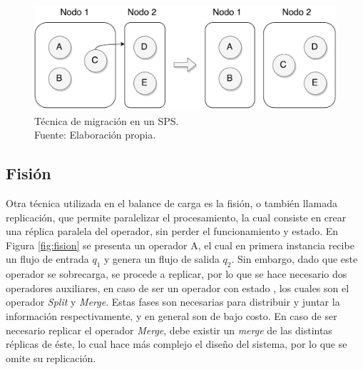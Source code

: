 \begin{figure}[!ht]
	\centering
	\includegraphics[scale=0.45]{images/Migracion.pdf}
	\caption[T\'ecnica de migraci\'on en un SPS.]{T\'ecnica de migraci\'on en un SPS.\\Fuente: Elaboraci\'on propia.}
	\label{fig:migracion}
\end{figure}

\subsection{Fisi\'on}
\label{sec:fisionBC}


Otra t\'ecnica utilizada en el balance de carga es la fisi\'on, o tambi\'en llamada replicaci\'on, que permite paralelizar el procesamiento, la cual consiste en crear una r\'eplica paralela del operador, sin perder el funcionamiento y estado. En Figura \ref{fig:fision} se presenta un operador A, el cual en primera instancia recibe un flujo de entrada $q_1$ y genera un flujo de salida $q_2$. Sin embargo, dado que este operador se sobrecarga, se procede a replicar, por lo que se hace necesario dos operadores auxiliares, \normalsize{en caso de ser un operador con estado} \citep{WuKWO12}, los cuales son el operador \textit{Split} y \textit{Merge}. Estas fases son necesarias para distribuir y juntar la informaci\'on respectivamente, y en general son de bajo costo. En caso de ser necesario replicar el operador \textit{Merge}, debe existir un \textit{merge} de las distintas r\'eplicas de \'este, lo cual hace m\'as complejo el dise\~no del sistema, por lo que se omite su replicaci\'on.

